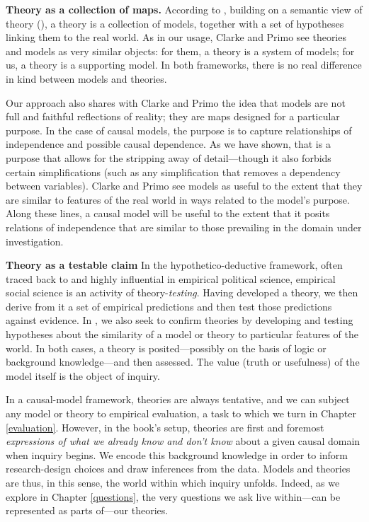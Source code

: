 \documentclass[
  12pt,
]{book}
\begin{document}
\textbf{Theory as a collection of maps.} According to \citet{clarke2012model}, building on a semantic view of theory (\citet{giere2010explaining}), a theory is a collection of models, together with a set of hypotheses linking them to the real world. As in our usage, Clarke and Primo see theories and models as very similar objects: for them, a theory is a system of models; for us, a theory is a supporting model. In both frameworks, there is no real difference in kind between models and theories.

Our approach also shares with Clarke and Primo the idea that models are not full and faithful reflections of reality; they are maps designed for a particular purpose. In the case of causal models, the purpose is to capture relationships of independence and possible causal dependence. As we have shown, that is a purpose that allows for the stripping away of detail---though it also forbids certain simplifications (such as any simplification that removes a dependency between variables). Clarke and Primo see models as useful to the extent that they are similar to features of the real world in ways related to the model's purpose. Along these lines, a causal model will be useful to the extent that it posits relations of independence that are similar to those prevailing in the domain under investigation.

\textbf{Theory as a testable claim} In the hypothetico-deductive framework, often traced back to \citet{popper2014conjectures} and highly influential in empirical political science, empirical social science is an activity of theory-\emph{testing}. Having developed a theory, we then derive from it a set of empirical predictions and then test those predictions against evidence. In \citet{clarke2012model}, we also seek to confirm theories by developing and testing hypotheses about the similarity of a model or theory to particular features of the world. In both cases, a theory is posited---possibly on the basis of logic or background knowledge---and then assessed. The value (truth or usefulness) of the model itself is the object of inquiry.

In a causal-model framework, theories are always tentative, and we can subject any model or theory to empirical evaluation, a task to which we turn in Chapter \ref{evaluation}. However, in the book's setup, theories are first and foremost \emph{expressions of what we already know and don't know} about a given causal domain when inquiry begins. We encode this background knowledge in order to inform research-design choices and draw inferences from the data. Models and theories are thus, in this sense, the world within which inquiry unfolds. Indeed, as we explore in Chapter \ref{questions}, the very questions we ask live within---can be represented as parts of---our theories.
\end{document}
